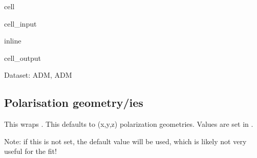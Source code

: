 \documentclass[letterpaper,table,10pt,english]{jupyterBook}
\begin{document}
\begin{sphinxuseclass}{cell}\begin{sphinxVerbatimInput}

\begin{sphinxuseclass}{cell_input}
\begin{sphinxVerbatim}[commandchars=\\\{\}]
 inline
  
\end{sphinxVerbatim}

\end{sphinxuseclass}\end{sphinxVerbatimInput}
\begin{sphinxVerbatimOutput}

\begin{sphinxuseclass}{cell_output}
\begin{sphinxVerbatim}[commandchars=\\\{\}]
Dataset: ADM, ADM
\end{sphinxVerbatim}

\noindent{}

\end{sphinxuseclass}\end{sphinxVerbatimOutput}

\end{sphinxuseclass}

\subsection{Polarisation geometry/ies}
\label{\detokenize{part2/basic_fitting_numerics_intro_260423:polarisation-geometry-ies}}
\sphinxAtStartPar
This wraps . This defaults to (x,y,z) polarization geometries. Values are set in .

\sphinxAtStartPar
Note: if this is not set, the default value will be used, which is likely not very useful for the fit!
\end{document}
